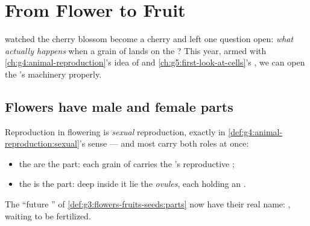 \chapter{From Flower to Fruit}\label{ch:g5:flower-to-fruit}

 watched the cherry blossom
become a cherry and left one question open: \emph{what
actually happens} when a grain of  lands on the ?
This year, armed with \cref{ch:g4:animal-reproduction}'s idea
of  and \cref{ch:g5:first-look-at-cells}'s ,
we can open the 's machinery properly.

\section{Flowers have male and female parts}

\begin{proposition}\label{prop:g5:flower-to-fruit:roles}
Reproduction in flowering  is \emph{sexual}
reproduction, exactly in
\cref{def:g4:animal-reproduction:sexual}'s sense --- and most
 carry both roles at once:
\begin{itemize}
  \item the \emph{} are the  part: each grain of
        \emph{} carries the 's  reproductive
        ;
  \item the \emph{} is the  part: deep inside it
        lie the \emph{ovules}, each holding an
        .
\end{itemize}
The ``future '' of
\cref{def:g3:flowers-fruits-seeds:parts} now have their real
name: , waiting to be fertilized.
\end{proposition}
\admitted

